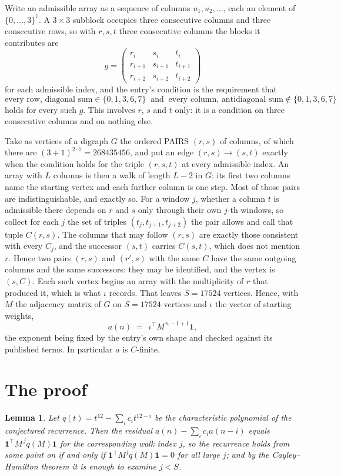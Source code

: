 \documentclass[11pt,a4paper]{article}
\theoremstyle{plain}
\newtheorem{lemma}[theorem]{Lemma}
\theoremstyle{definition}
\begin{document}
Write an admissible array as a sequence of columns $u_1,u_2,\dots$, each an element of
$\{0,\dots,3\}^{7}$. A $3\times3$ subblock occupies three consecutive columns and
three consecutive rows, so with $r,s,t$ three consecutive columns the blocks it
contributes are
\[
g=\begin{pmatrix}r_i&s_i&t_i\\ r_{i+1}&s_{i+1}&t_{i+1}\\ r_{i+2}&s_{i+2}&t_{i+2}\end{pmatrix}
\]
for each admissible index, and the entry's condition is the requirement that
\[
\text{every row, diagonal sum} \in \{0,1,3,6,7\}\ \text{ and }\ \text{every column, antidiagonal sum} \notin \{0,1,3,6,7\}
\]
holds for every such $g$. This involves $r$, $s$ and $t$ only: it is a condition on
three consecutive columns and on nothing else.

Take as vertices of a digraph $G$ the ordered PAIRS $(r,s)$ of columns, of which there are
$(3+1)^{2\cdot7}=268435456$, and put an edge $(r,s)\to(s,t)$ exactly when the condition
holds for the triple $(r,s,t)$ at every admissible index. An array with $L$ columns is then a
walk of length $L-2$ in $G$: its first two columns name the starting vertex and each further
column is one step. Most of those pairs are indistinguishable, and exactly so. For a window $j$, whether a column $t$ is admissible there depends on $r$ and $s$ only through their own $j$-th windows, so collect for each $j$ the set of triples $(t_j,t_{j+1},t_{j+2})$ the pair allows and call that tuple $C(r,s)$. The columns that may follow $(r,s)$ are exactly those consistent with every $C_j$, and the successor $(s,t)$ carries $C(s,t)$, which does not mention $r$. Hence two pairs $(r,s)$ and $(r',s)$ with the same $C$ have the same outgoing columns and the same successors: they may be identified, and the vertex is $(s,C)$. Each such vertex begins an array with the multiplicity of $r$ that produced it, which is what $\iota$ records. That leaves $S=17524$ vertices. Hence, with $M$ the adjacency matrix of $G$ on $S=17524$ vertices and
$\iota$ the vector of starting weights,
\[
a(n)\;=\;\,\iota^{\!\top}M^{\,n-1+1}\mathbf{1},
\]
the exponent being fixed by the entry's own shape and checked against its published terms.
In particular $a$ is $C$-finite.

\section{The proof}

\begin{lemma}\label{lem:crit}
Let $q(t)=t^{12}-\sum_i c_it^{12-i}$ be the characteristic polynomial of the
conjectured recurrence. Then the residual $a(n)-\sum_ic_ia(n-i)$ equals
$\mathbf{1}^{\!\top}M^{\,j}q(M)\mathbf{1}$ for the corresponding walk index
$j$, so the recurrence holds from some point on if and only if
$\mathbf{1}^{\!\top}M^{j}q(M)\mathbf{1}=0$ for all large $j$; and by the
Cayley--Hamilton theorem it is enough to examine $j<S$.
\end{lemma}
\end{document}
